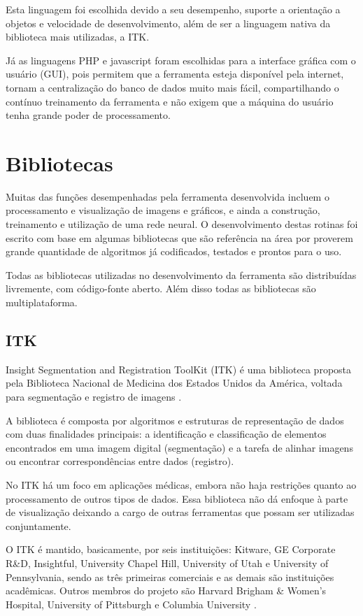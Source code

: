 Esta linguagem foi escolhida devido a seu desempenho, suporte a orientação a objetos e velocidade de desenvolvimento, além de ser a linguagem nativa da biblioteca mais utilizadas, a ITK.

Já as linguagens PHP e javascript foram escolhidas para a interface gráfica com o usuário (GUI), pois permitem que a ferramenta esteja disponível pela internet, tornam a centralização do banco de dados muito mais fácil, compartilhando o contínuo treinamento da ferramenta e não exigem que a máquina do usuário tenha grande poder de processamento.

\section{Bibliotecas}

Muitas das funções desempenhadas pela ferramenta desenvolvida incluem o processamento e visualização de imagens e gráficos, e ainda a construção, treinamento e utilização de uma rede neural. O desenvolvimento destas rotinas foi escrito com base em algumas bibliotecas que são referência na área por proverem grande quantidade de algoritmos já codificados, testados e prontos para o uso.

Todas as bibliotecas utilizadas no desenvolvimento da ferramenta são distribuídas livremente, com código-fonte aberto. Além disso todas as bibliotecas são multiplataforma.

\subsection{ITK}

Insight Segmentation and Registration ToolKit (ITK) é uma biblioteca proposta pela Biblioteca Nacional de Medicina dos Estados Unidos da América, voltada para segmentação e registro de imagens \cite{yoo}.

A biblioteca é composta por algoritmos e estruturas de representação de dados com duas finalidades principais: a identificação e classificação de elementos encontrados em uma imagem digital (segmentação) e a tarefa de alinhar imagens ou encontrar correspondências entre dados (registro).

No ITK há um foco em aplicações médicas, embora não haja restrições quanto ao processamento de outros tipos de dados. Essa biblioteca não dá enfoque à parte de visualização deixando a cargo de outras ferramentas que possam ser utilizadas conjuntamente.

O ITK é mantido, basicamente, por seis instituições: Kitware, GE Corporate R\&D, Insightful, University Chapel Hill, University of Utah e University of Pennsylvania, sendo as três primeiras comerciais e as demais são instituições acadêmicas. Outros membros do projeto são Harvard Brigham \& Women's Hospital, University of Pittsburgh e Columbia University \cite{itk-page}.

